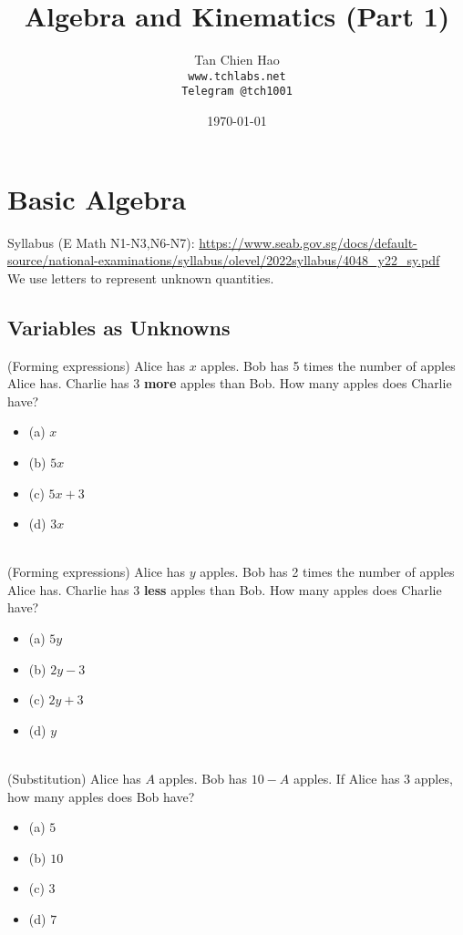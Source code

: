 \documentclass{article}
\title{Algebra and Kinematics (Part 1)}
\author{
    Tan Chien Hao\\
    \texttt{www.tchlabs.net}\\
    \texttt{Telegram @tch1001}
}
\date{\today}
\begin{document}
\newif\ifpaper

\paperfalse 

\maketitle
\section{Basic Algebra}
Syllabus (E Math N1-N3,N6-N7): \url{https://www.seab.gov.sg/docs/default-source/national-examinations/syllabus/olevel/2022syllabus/4048_y22_sy.pdf} \\[20pt]
We use letters to represent unknown quantities. \\[10pt]
\subsection{Variables as Unknowns}
(Forming expressions) Alice has $x$ apples. Bob has 5 times the number of apples Alice has. Charlie has 3 \textbf{more} apples than Bob. How many apples does Charlie have? 
\begin{itemize}
    \item[] (a) $x$
    \item[] (b) $5x$
    \item[] (c) $5x+3$
    \item[] (d) $3x$
\end{itemize} \hrulefill \\[10pt]
\newpage
\noindent (Forming expressions) Alice has $y$ apples. Bob has 2 times the number of apples Alice has. Charlie has 3 \textbf{less} apples than Bob. How many apples does Charlie have? 
\begin{itemize}
    \item[] (a) $5y$
    \item[] (b) $2y-3$
    \item[] (c) $2y+3$
    \item[] (d) $y$
\end{itemize} \hrulefill \\[10pt]
(Substitution) Alice has $A$ apples. Bob has $10-A$ apples. If Alice has $3$ apples, how many apples does Bob have? 
\begin{itemize}
    \item[] (a) $5$
    \item[] (b) $10$
    \item[] (c) $3$
    \item[] (d) $7$
\end{itemize} \hrulefill \\[10pt]
\end{document}
